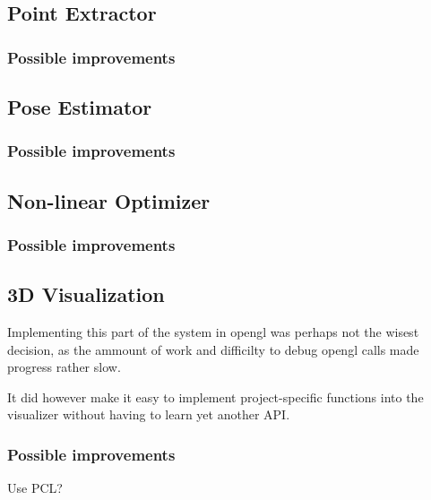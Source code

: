 
\subsection{Point Extractor}


\subsubsection{Possible improvements}


\subsection{Pose Estimator}


\subsubsection{Possible improvements}


\subsection{Non-linear Optimizer}


\subsubsection{Possible improvements}


\pagebreak
\subsection{3D Visualization}
Implementing this part of the system in opengl was perhaps not the wisest decision, as the ammount of work and difficilty to debug opengl calls made progress rather slow.

It did however make it easy to implement project-specific functions into the visualizer without having to learn yet another API.

\subsubsection{Possible improvements}
Use PCL?